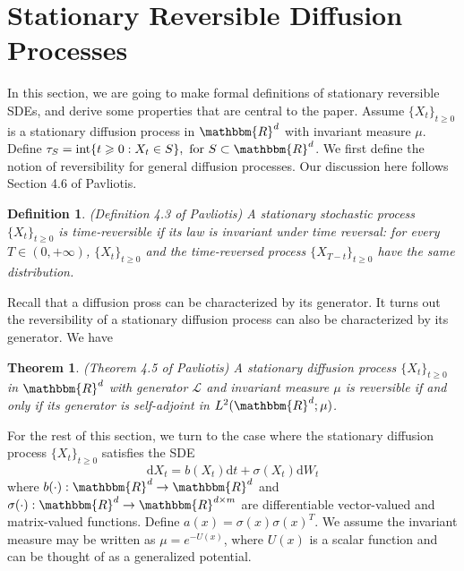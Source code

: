 \documentclass[english, aip, jcp, priprint, graphicx]{revtex4-1}
\newtheorem{definition}{Definition}
\newtheorem{theorem}{Theorem}
\theoremstyle{plain}
\theoremstyle{definition}
\theoremstyle{plain}
\begin{document}
\appendix

\section{Stationary Reversible Diffusion Processes}\label{sec:reversible_diffusion}

In this section, we are going to make formal definitions of stationary
reversible SDEs, and derive some properties that are central to the paper.
Assume $\{X_t\}_{t \geqslant 0}$ is a stationary diffusion process in
$\mathbbm{R}^d$ with invariant measure ${\mu}$. Define $\tau_S
=\ensuremath{\operatorname{int}} \{ t \geqslant 0 : X_t \in S \} , \text{ for
} S \subset \mathbbm{R}^d$. We first define the notion of reversibility for
general diffusion processes. Our discussion here follows Section 4.6 of
Pavliotis\cite{Pavliotis2016-xn}.

\begin{definition}
(Definition 4.3 of Pavliotis\cite{Pavliotis2016-xn}) A stationary stochastic
process $\{X_t\}_{t \geqslant 0}$ is time-reversible if its law is invariant under time
reversal: for every $T \in (0, + \infty)$, $\{X_t\}_{t \geqslant 0}$ and the time-reversed
process $\{X_{T - t}\}_{t \geqslant 0}$ have the same distribution.
\end{definition}

Recall that a diffusion pross can be characterized by its generator. It turns
out the reversibility of a stationary diffusion process can also be
characterized by its generator. We have

\begin{theorem}
\label{thm:reversibility}(Theorem 4.5 of Pavliotis\cite{Pavliotis2016-xn}) A
stationary diffusion process $\{X_t\}_{t \geqslant 0}$ in $\mathbbm{R}^d$ with generator
$\mathcal{L}$ and invariant measure ${\mu}$ is reversible if and only if
its generator is self-adjoint in $L^2 (\mathbbm{R}^d ; {\mu})$.
\end{theorem}

For the rest of this section, we turn to the case where the stationary
diffusion process $\{X_t\}_{t \geqslant 0}$ satisfies the SDE
\[ \mathrm{d} X_t = b (X_t) \mathrm{d} t + \sigma (X_t) \mathrm{d} W_t \]
where $b (\cdot) : \mathbbm{R}^d \rightarrow \mathbbm{R}^d$ and $\sigma
(\cdot) : \mathbbm{R}^d \rightarrow \mathbbm{R}^{d \times m}$ are
differentiable vector-valued and matrix-valued functions. Define $a (x) =
\sigma (x) \sigma (x)^T$. We assume the invariant measure may be written as
${\mu}= e^{- U (x)}$, where $U (x)$ is a scalar function and can be
thought of as a generalized potential.
\end{document}
